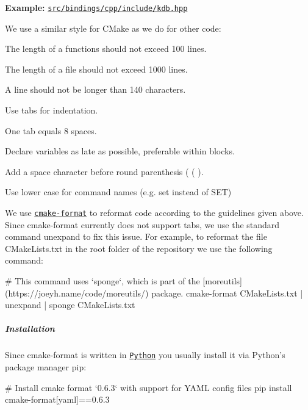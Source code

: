 {\bfseries Example\+:} \href{/home/jenkins/workspace/libelektra-release/src/bindings/cpp/include/kdb.hpp}{\tt src/bindings/cpp/include/kdb.\+hpp}

We use a similar style for C\+Make as we do for other code\+:


\begin{DoxyItemize}
\item The length of a functions should not exceed 100 lines.
\item The length of a file should not exceed 1000 lines.
\item A line should not be longer than 140 characters.
\item Use tabs for indentation.
\item One tab equals 8 spaces.
\item Declare variables as late as possible, preferable within blocks.
\item Add a space character before round parenthesis ( {\ttfamily (} ).
\item Use lower case for command names (e.\+g. {\ttfamily set} instead of {\ttfamily S\+ET})
\end{DoxyItemize}

We use \href{https://github.com/cheshirekow/cmake_format}{\tt {\ttfamily cmake-\/format}} to reformat code according to the guidelines given above. Since {\ttfamily cmake-\/format} currently does not support tabs, we use the standard command {\ttfamily unexpand} to fix this issue. For example, to reformat the file {\ttfamily C\+Make\+Lists.\+txt} in the root folder of the repository we use the following command\+:


\begin{DoxyCode}
# This command uses `sponge`, which is part of the [moreutils](https://joeyh.name/code/moreutils/) package.
cmake-format CMakeLists.txt | unexpand | sponge CMakeLists.txt
\end{DoxyCode}


\label{invalid_invalid}%
%
\subparagraph*{Installation}

Since {\ttfamily cmake-\/format} is written in \href{https://www.python.org}{\tt Python} you usually install it via Python’s package manager {\ttfamily pip}\+:


\begin{DoxyCode}
# Install cmake format `0.6.3` with support for YAML config files
pip install cmake-format[yaml]==0.6.3
\end{DoxyCode}


